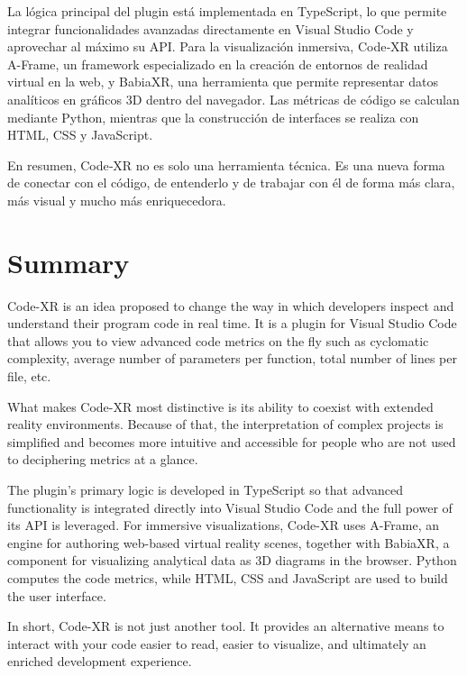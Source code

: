 \documentclass[a4paper, 12pt]{book}
\begin{document}
La lógica principal del plugin está implementada en TypeScript, lo que permite integrar funcionalidades avanzadas directamente en Visual Studio Code y aprovechar al máximo su API. Para la visualización inmersiva, Code‑XR utiliza A-Frame, un framework especializado en la creación de entornos de realidad virtual en la web, y BabiaXR, una herramienta que permite representar datos analíticos en gráficos 3D dentro del navegador. Las métricas de código se calculan mediante Python, mientras que la construcción de interfaces se realiza con HTML, CSS y JavaScript.


En resumen, Code‑XR no es solo una herramienta técnica. Es una nueva forma de conectar con el código, de entenderlo y de trabajar con él de forma más clara, más visual y mucho más enriquecedora.





\chapter*{Summary}

Code-XR is an idea proposed to change the way in which developers inspect and understand their program code in real time. It is a plugin for Visual Studio Code that allows you to view advanced code metrics on the fly such as cyclomatic complexity, average number of parameters per function, total number of lines per file, etc.

What makes Code-XR most distinctive is its ability to coexist with extended reality environments. Because of that, the interpretation of complex projects is simplified and becomes more intuitive and accessible for people who are not used to deciphering metrics at a glance.

The plugin's primary logic is developed in TypeScript so that advanced functionality is integrated directly into Visual Studio Code and the full power of its API is leveraged. For immersive visualizations, Code-XR uses A-Frame, an engine for authoring web-based virtual reality scenes, together with BabiaXR, a component for visualizing analytical data as 3D diagrams in the browser. Python computes the code metrics, while HTML, CSS and JavaScript are used to build the user interface.

In short, Code-XR is not just another tool. It provides an alternative means to interact with your code easier to read, easier to visualize, and ultimately an enriched development experience.
\end{document}
